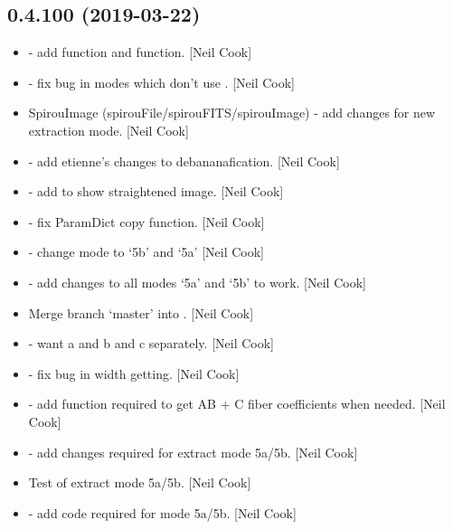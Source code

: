 \documentclass[a4paper,10pt,english]{report}
\begin{document}
\subsection{0.4.100 (2019-03-22)}
\label{\detokenize{misc/changelog:id159}}\begin{itemize}
\item {} 
 - add  function and
 function. {[}Neil Cook{]}

\item {} 
 - fix bug in modes which don’t use . {[}Neil Cook{]}

\item {} 
SpirouImage (spirouFile/spirouFITS/spirouImage) - add changes for new
extraction mode. {[}Neil Cook{]}

\item {} 
 - add etienne’s changes to debananafication. {[}Neil
Cook{]}

\item {} 
 - add  to show straightened image.
{[}Neil Cook{]}

\item {} 
 - fix ParamDict copy function. {[}Neil Cook{]}

\item {} 
 - change mode to ‘5b’ and ‘5a’ {[}Neil Cook{]}

\item {} 
 - add changes to all modes ‘5a’ and ‘5b’ to
work. {[}Neil Cook{]}

\item {} 
Merge branch ‘master’ into . {[}Neil Cook{]}

\item {} 
 - want a and b and c separately. {[}Neil Cook{]}

\item {} 
 - fix bug in width getting. {[}Neil Cook{]}

\item {} 
 - add function required to get AB + C fiber
coefficients when needed. {[}Neil Cook{]}

\item {} 
 - add changes required for extract mode 5a/5b. {[}Neil
Cook{]}

\item {} 
Test of extract mode 5a/5b. {[}Neil Cook{]}

\item {} 
 - add code required for mode 5a/5b. {[}Neil
Cook{]}

\end{itemize}
\end{document}
